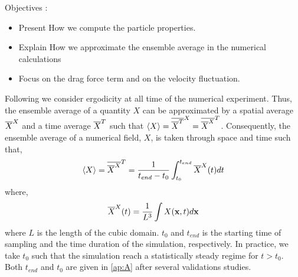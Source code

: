 Objectives : 
\begin{itemize}
    \item Present How we compute the particle properties. 
    \item Explain How we approximate the ensemble average in the numerical calculations
    \item Focus on the drag force term and on the velocity fluctuation. 
\end{itemize}

Following \citet{du2022analysis} we consider ergodicity at all time of the numerical experiment.
Thus, the ensemble average of a quantity $X$ can be approximated by a spatial average $\overline{X}^X$ and a time average $\overline{X}^T$ such that $\left<X\right> = \overline{\overline{X}^T}^X=\overline{\overline{X}^X}^T$.
Consequently, the ensemble average of a numerical field, $X$, is taken through space and time such that,
\begin{equation}
    \left<X\right>
    = \overline{\overline{X}^X}^T
    = \frac{1}{ t_{end} - t_0}\int_{t_0}^{t_{end}} 
    \overline{X}^X(t) dt
\end{equation}
where, 
\begin{equation}
    \overline{X}^X(t)
    = \frac{1}{L^3}\int 
    X(\textbf{x},t) d\textbf{x}
\end{equation}
where $L$ is the length of the cubic domain.
$t_0$ and $t_{end}$ is the starting time of sampling and the time duration of the simulation, respectively.
In practice, we take $t_0$ such that the simulation reach a statistically steady regime for $t>t_0$.  
Both $t_{end} $ and $t_0$ are given in \ref{ap:A} after several validations studies. 

